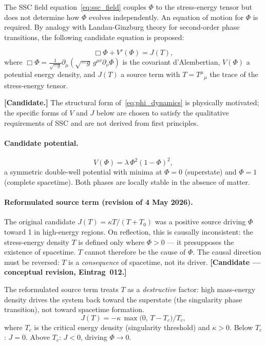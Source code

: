 \documentclass[12pt,a4paper]{article}
\begin{document}
The SSC field equation~\eqref{eq:ssc_field} couples $\Phi$ to
the stress-energy tensor but does not determine how $\Phi$ evolves
independently. An equation of motion for $\Phi$ is required.
By analogy with Landau-Ginzburg theory for second-order phase
transitions, the following candidate equation is proposed:

\begin{equation}
  \Box\Phi + V'(\Phi) = J(T),
  \label{eq:phi_dynamics}
\end{equation}
where $\Box\Phi = \frac{1}{\sqrt{-g}}\partial_\mu
(\sqrt{-g}\,g^{\mu\nu}\partial_\nu\Phi)$ is the covariant
d'Alembertian, $V(\Phi)$ a potential energy density, and $J(T)$
a source term with $T = T^\mu{}_\mu$ the trace of the
stress-energy tensor.

\textbf{[Candidate.]} The structural form of~\eqref{eq:phi_dynamics}
is physically motivated; the specific forms of $V$ and $J$ below are
chosen to satisfy the qualitative requirements of SSC and are not
derived from first principles.

\paragraph{Candidate potential.}
\begin{equation}
  V(\Phi) = \lambda\,\Phi^2(1-\Phi)^2,
  \label{eq:potential}
\end{equation}
a symmetric double-well potential with minima at $\Phi = 0$
(superstate) and $\Phi = 1$ (complete spacetime). Both phases are
locally stable in the absence of matter.

\paragraph{Reformulated source term (revision of 4 May 2026).}

The original candidate $J(T) = \kappa T/(T+T_0)$ was a positive source
driving $\Phi$ toward 1 in high-energy regions.  On reflection, this is
causally inconsistent: the stress-energy density $T$ is defined only
where $\Phi > 0$ — it presupposes the existence of spacetime.  $T$
cannot therefore be the cause of $\Phi$.  The causal direction must be
reversed: $T$ is a \emph{consequence} of spacetime, not its driver.
\textbf{[Candidate — conceptual revision, Eintrag~012.]}

The reformulated source term treats $T$ as a \emph{destructive} factor:
high mass-energy density drives the system back toward the superstate
(the singularity phase transition), not toward spacetime formation.
\begin{equation}
  J(T) = -\kappa\,\max\!\bigl(0,\,T - T_c\bigr)/T_c,
  \label{eq:source}
\end{equation}
where $T_c$ is the critical energy density (singularity threshold) and
$\kappa > 0$.  Below $T_c$: $J = 0$.
Above $T_c$: $J < 0$, driving $\Phi \to 0$.
\end{document}
